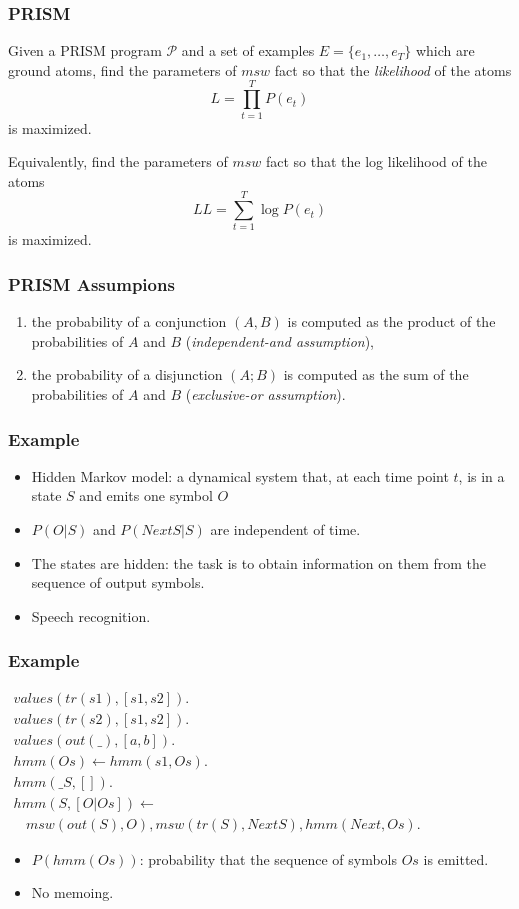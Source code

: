 \documentclass[trans,aspectratio=1610]{beamer}
\newcommand{\defpprog}{\ensuremath{\mathcal{P}}\xspace}
\newcommand{\lpif}{\leftarrow}
\begin{document}
\begin{frame}
  \frametitle{PRISM}
\begin{definition}
Given a PRISM program \defpprog and a set of examples $E=\{e_1,\ldots,e_T\}$ which
are ground atoms,
find the parameters of $msw$ fact so that the \emph{likelihood} of the  atoms 
$$L=\prod_{t=1}^T P(e_t)$$
 is 
maximized.

Equivalently, find the parameters of $msw$ fact so that the log likelihood of the  atoms 
$$LL=\sum_{t=1}^T \log P(e_t)$$ is maximized.
\end{definition}
\end{frame}
\begin{frame}
  \frametitle{PRISM Assumpions}
\begin{enumerate}
\item  the probability of a conjunction
$(A, B)$ is computed as the product of the probabilities of $A$ and $B$ (\emph{independent-and assumption}), \label{ind}
\item
the probability of a disjunction $(A; B)$ is computed as the sum of the probabilities of $A$ and $B$
(\emph{exclusive-or assumption}). \label{ex}
\end{enumerate}
  \end{frame}
\begin{frame}
  \frametitle{Example}
  \begin{itemize}
\item Hidden Markov model:  a dynamical system that,
at each  time point $t$,  is in a state $S$ and
emits  one symbol $O$ 
\item  $P(O|S)$  and
$P(NextS|S)$ are independent of time.
\item The states are  hidden:
the task is to obtain information on them from the sequence of output symbols.
\item Speech recognition.
\end{itemize}
\end{frame}
\begin{frame}
  \frametitle{Example}

$\begin{array}{l}
values(tr(s1),[s1,s2]).\\
values(tr(s2),[s1,s2]).\\
values(out(\_),[a,b]).\\
hmm(Os)\lpif hmm(s1,Os).\\
hmm(\_S,[]).\\ 
hmm(S,[O|Os])\lpif \\
\ \ \ \ 
  msw(out(S),O),  msw(tr(S),NextS),  
  hmm(Next,Os).
\end{array}$

  \begin{itemize}
\item  $P(hmm(Os))$:
probability that the sequence of symbols $Os$ is emitted.
\item No \alert{memoing}.
\end{itemize}
\end{frame}
\end{document}

